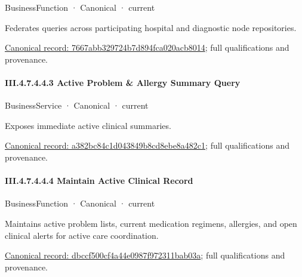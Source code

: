 \label{element:7667abb329724b7d894fca020acb8014}
{\small BusinessFunction · Canonical · current}\par

Federates queries across participating hospital and diagnostic node repositories.


{\footnotesize \href{../../../../../../../../continuum/business/business-function/7667abb329724b7d894fca020acb8014.md}{Canonical record: 7667abb329724b7d894fca020acb8014}; full qualifications and provenance.}\par
\paragraph*{III.4.7.4.4.3 Active Problem \& Allergy Summary Query}
\label{navigation:III.4.7.4.4.3}

\label{element:a382bc84c1d043849b8cd8ebe8a482c1}
{\small BusinessService · Canonical · current}\par

Exposes immediate active clinical summaries.


{\footnotesize \href{../../../../../../../../continuum/business/business-service/a382bc84c1d043849b8cd8ebe8a482c1.md}{Canonical record: a382bc84c1d043849b8cd8ebe8a482c1}; full qualifications and provenance.}\par
\paragraph*{III.4.7.4.4.4 Maintain Active Clinical Record}
\label{navigation:III.4.7.4.4.4}

\label{element:dbccf500cf4a44e0987f972311bab03a}
{\small BusinessFunction · Canonical · current}\par

Maintains active problem lists, current medication regimens, allergies, and open clinical alerts for active care coordination.


{\footnotesize \href{../../../../../../../../continuum/business/business-function/dbccf500cf4a44e0987f972311bab03a.md}{Canonical record: dbccf500cf4a44e0987f972311bab03a}; full qualifications and provenance.}\par
